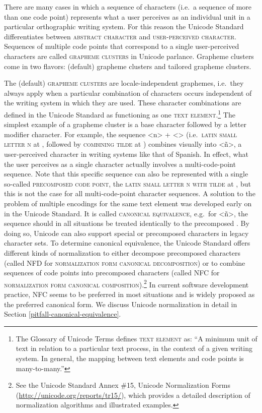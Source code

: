 There are many cases in which a sequence of characters (i.e.~a sequence of more
than one code point) represents what a user perceives as an individual unit in a
particular orthographic writing system. For this reason the Unicode Standard
differentiates between \textsc{abstract character} and \textsc{user-perceived
character}. Sequences of multiple code points that correspond to a single
user-perceived characters are called \textsc{grapheme clusters} in Unicode parlance.
Grapheme clusters come in two flavors: (default) grapheme clusters and tailored
grapheme clusters.

The (default) \textsc{grapheme clusters} are locale-independent graphemes,
i.e.~they always apply when a particular combination of characters occurs
independent of the writing system in which they are used. These character
combinations are defined in the Unicode Standard as functioning as one
\textsc{text element}.\footnote{The Glossary of Unicode Terms defines \textsc{text element} as:
``A minimum unit of text in relation to a particular text process, in the
context of a given writing system. In general, the mapping between text elements
and code points is many-to-many.''} The simplest example of a grapheme cluster
is a base character followed by a letter modifier character. For example, the
sequence <n> + <> (i.e.~\textsc{latin small letter n} at , followed
by \textsc{combining tilde} at ) combines visually into <ñ>, a
user-perceived character in writing systems like that of Spanish. In effect, what the
user perceives as a single character actually involves a multi-code-point
sequence. Note that this specific sequence can also be represented with a single
so-called \textsc{precomposed code point}, the \textsc{latin small letter n with
tilde} at , but this is not the case for all multi-code-point
character sequences. A solution to the problem of multiple encodings for the
same text element was developed early on in the Unicode Standard. It is called 
\textsc{canonical equivalence}, e.g.~for <ñ>, the sequence   
should in all situations be treated identically to the precomposed . By doing so, 
Unicode can also support special or precomposed characters in legacy character sets. 
To determine canonical equivalence, the Unicode Standard offers different kinds of normalization to either 
decompose precomposed characters (called \textsc{NFD} for \textsc{normalization form
canonical decomposition}) or to combine sequences of code points into precomposed 
characters (called \textsc{NFC} for \textsc{normalization form canonical composition}).\footnote{See the 
Unicode Standard Annex \#15, Unicode Normalization Forms (\url{http://unicode.org/reports/tr15/}), 
which provides a detailed description of normalization algorithms and illustrated examples.} 
In current software development practice, NFC seems to be preferred in most situations
and is widely proposed as the preferred canonical form. We discuss Unicode normalization 
in detail in Section \ref{pitfall-canonical-equivalence}.

